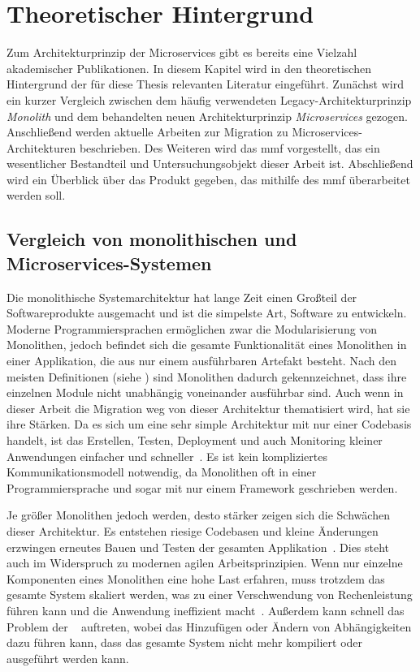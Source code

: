 \chapter{Theoretischer Hintergrund}
\label{chap:theoretischer-hintergrund}
Zum Architekturprinzip der Microservices gibt es bereits eine Vielzahl akademischer Publikationen.
In diesem Kapitel wird in den theoretischen Hintergrund der für diese Thesis relevanten Literatur eingeführt.
Zunächst wird ein kurzer Vergleich zwischen dem häufig verwendeten Legacy-Architekturprinzip \emph{Monolith} und dem behandelten neuen Architekturprinzip \emph{Microservices} gezogen.
Anschließend werden aktuelle Arbeiten zur Migration zu Microservices-Architekturen beschrieben.
Des Weiteren wird das \acrfull{mmf} vorgestellt, das ein wesentlicher Bestandteil und Untersuchungsobjekt dieser Arbeit ist.
Abschließend wird ein Überblick über das Produkt gegeben, das mithilfe des \gls{mmf} überarbeitet werden soll.

\section{Vergleich von monolithischen und Microservices-Systemen}
\label{sec:monolith-vs-microservices}

Die monolithische Systemarchitektur hat lange Zeit einen Großteil der Softwareprodukte ausgemacht und ist die simpelste Art, Software zu entwickeln.
Moderne Programmiersprachen ermöglichen zwar die Modularisierung von Monolithen, jedoch befindet sich die gesamte Funktionalität eines Monolithen in einer Applikation, die aus nur einem ausführbaren Artefakt besteht.
Nach den meisten Definitionen (siehe \cite{Dragoni2017}) sind Monolithen dadurch gekennzeichnet, dass ihre einzelnen Module nicht unabhängig voneinander ausführbar sind.
Auch wenn in dieser Arbeit die Migration weg von dieser Architektur thematisiert wird, hat sie ihre Stärken.
Da es sich um eine sehr simple Architektur mit nur einer Codebasis handelt, ist das Erstellen, Testen, Deployment und auch Monitoring kleiner Anwendungen einfacher und schneller~\cite{10220070}.
Es ist kein kompliziertes Kommunikationsmodell notwendig, da Monolithen oft in einer Programmiersprache und sogar mit nur einem Framework geschrieben werden.

Je größer Monolithen jedoch werden, desto stärker zeigen sich die Schwächen dieser Architektur.
Es entstehen riesige Codebasen und kleine Änderungen erzwingen erneutes Bauen und Testen der gesamten Applikation~\cite{Dragoni2017}.
Dies steht auch im Widerspruch zu modernen agilen Arbeitsprinzipien.
Wenn nur einzelne Komponenten eines Monolithen eine hohe Last erfahren, muss trotzdem das gesamte System skaliert werden, was zu einer Verschwendung von Rechenleistung führen kann und die Anwendung ineffizient macht~\cite{Dragoni2017}.
Außerdem kann schnell das Problem der ~\cite{Dragoni2017} auftreten, wobei das Hinzufügen oder Ändern von Abhängigkeiten dazu führen kann, dass das gesamte System nicht mehr kompiliert oder ausgeführt werden kann.

